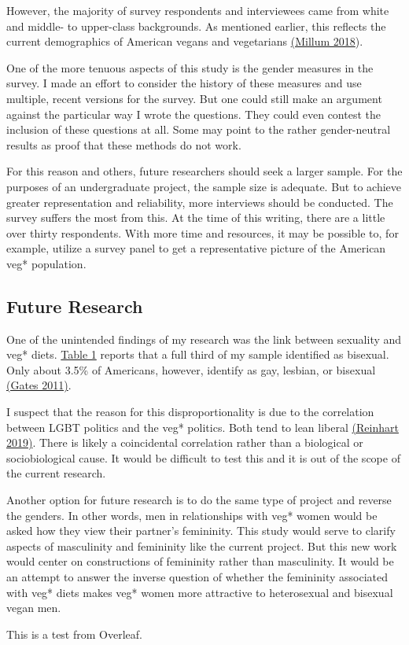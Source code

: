 \documentclass[twoside]{report}
\begin{document}
\begin{multicols}{2}
However, the majority of survey respondents and interviewees came from
white and middle- to upper-class backgrounds. As mentioned earlier, this reflects the current demographics of American vegans and vegetarians \hyperlink{millum}{(Millum 2018}).

One of the more tenuous aspects of this study is the gender measures in
the survey. I made an effort to consider the history of these measures
and use multiple, recent versions for the survey. But one could still
make an argument against the particular way I wrote the questions. They
could even contest the inclusion of these questions at all. Some may
point to the rather gender-neutral results as proof that these methods
do not work.

For this reason and others, future researchers should seek a larger
sample. For the purposes of an undergraduate project, the sample size is
adequate. But to achieve greater representation and reliability, more
interviews should be conducted. The survey suffers the most from this.
At the time of this writing, there are a little over thirty respondents. 
With more time and resources, it may be possible to, for example, utilize a survey
panel to get a representative picture of the American veg* population.

\hypertarget{future-research}{\subsection{Future Research}}

One of the unintended findings of my research was the link between
sexuality and veg* diets. \hyperlink{table-1}{Table 1} reports that a full third of my sample identified as bisexual. Only about 3.5\% of Americans, however, identify as gay, lesbian, or bisexual \hyperlink{gates}{(Gates 2011)}. 

I suspect that the reason for this disproportionality is due to the correlation between LGBT politics and the veg* politics. Both tend to lean liberal \hyperlink{reinhart}{(Reinhart 2019)}. There is likely a coincidental correlation rather than a biological or sociobiological cause. It would be difficult to test this and it is out of the scope of the current research.

Another option for future research is to do the same type of project and reverse the genders. In other words, men in relationships with
veg* women would be asked how they view their partner's femininity. This
study would serve to clarify aspects of masculinity and femininity
like the current project. But this new work would center on
constructions of femininity rather than masculinity. It would be an
attempt to answer the inverse question of whether the femininity
associated with veg* diets makes veg* women more attractive to
heterosexual and bisexual vegan men.

This is a test from Overleaf.

\end{multicols}
\end{document}
